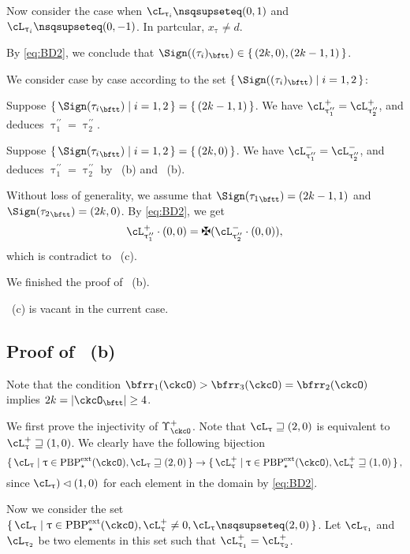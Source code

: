 \documentclass[12pt,a4paper]{amsart}
\def\abs#1{\left|{#1}\right|}
\def\pac#1{\ac_{#1}^+}
\def\nac#1{\ac_{#1}^-}
\def\ac{\cL}
\numberwithin{equation}{section}
\theoremstyle{remark}
\def\PBPes{\mathrm{PBP}^{\mathrm{ext}}_{\star}}
\def\uptaupp{\uptau^{\prime\prime}}
\begin{document}
\smallskip

Now consider the case when $\ac_{\uptau_{i}}\nsqsupseteq (0,1)$
and $\ac_{\uptau_{i}}\nsqsupseteq (0,-1)$. In partcular, $x_{\uptau}\neq d$.

By \eqref{eq:BD2}, we conclude that $\Sign((\tau_{i})_{\bftt}) \in \set{ (2k,0),(2k-1,1)}$.

We consider case by case according to the set $\set{\Sign((\tau_{i})_{\bftt})|i=1,2}$:
  \begin{enumPF}
    \item Suppose
    $\set{\Sign({\tau_{i}}_{\bftt})|i=1,2} = \set{(2k-1,1)}$. We have
    $\pac{\uptaupp_{1}}=\pac{\uptaupp_{2}}$, and deduces
    $\uptaupp_{1}=\uptaupp_{2}$.
    \item
    Suppose $\set{\Sign({\tau_{i}}_{\bftt})|i=1,2} = \set{(2k,0)}$. We have
    $\nac{\uptaupp_{1}}=\nac{\uptaupp_{2}}$, and deduces
    $\uptaupp_{1}=\uptaupp_{2}$ by ~(b) and ~(b).
    \item
    Without loss of generality, we assume that
    $\Sign({\tau_{1}}_{\bftt}) = (2k-1,1)$ and
    $\Sign({\tau_{2}}_{\bftt}) = (2k,0)$.
    By \eqref{eq:BD2}, we get
    \[
      \pac{\uptaupp_{1}}\cdot (0,0)=\maltese(\nac{\uptaupp_{2}}\cdot (0,0)),
    \]
    which is contradict to ~(c).
  \end{enumPF}
  We finished the proof of ~(b).

  ~(c) is vacant in the current case.


\subsection*{\bf Proof of ~(b)}
Note that the condition $\bfrr_{1}(\ckcO)>\bfrr_{3}(\ckcO)=\bfrr_{2}(\ckcO)$
implies $2k = \abs{\ckcO_{\bftt}}\geq 4$.


We first prove the injectivity of $\Upsilon^{+}_{\ckcO}$.
  Note that $\ac_{\uptau}\sqsupseteq (2,0)$ is equivalent to
  $\pac{\uptau}\sqsupseteq (1,0)$.
  We clearly have the following  bijection
  \[
    \set{\ac_{\uptau}|\uptau\in \PBPes(\ckcO),\ac_{\uptau}\sqsupseteq (2,0)} \rightarrow \set{\pac{\uptau}|\uptau\in \PBPes(\ckcO),\pac{\uptau}\sqsupseteq (1,0)},
  \]
  since  $\ac_{\uptau})\lhd (1,0)$ for each element in the domain by \eqref{eq:BD2}.

  Now we consider the set
  $\set{\ac_{\uptau}|\uptau\in \PBPes(\ckcO), \pac{\uptau}\neq 0, \ac_{\uptau}\nsqsupseteq (2,0)}$. Let
  $\ac_{\uptau_{1}}$ and $\ac_{\uptau_{2}}$ be two elements in this set such that
  $\pac{\uptau_{1}}=\pac{\uptau_{2}}$.
\end{document}
